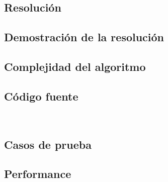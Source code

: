 \subsection{Resoluci\'on}


\subsection{Demostraci\'on de la resoluci\'on}


\subsection{Complejidad del algoritmo}


\subsection{C\'odigo fuente}

\begin{lstlisting}


\end{lstlisting}

\subsection{Casos de prueba}

\subsection{Performance}
